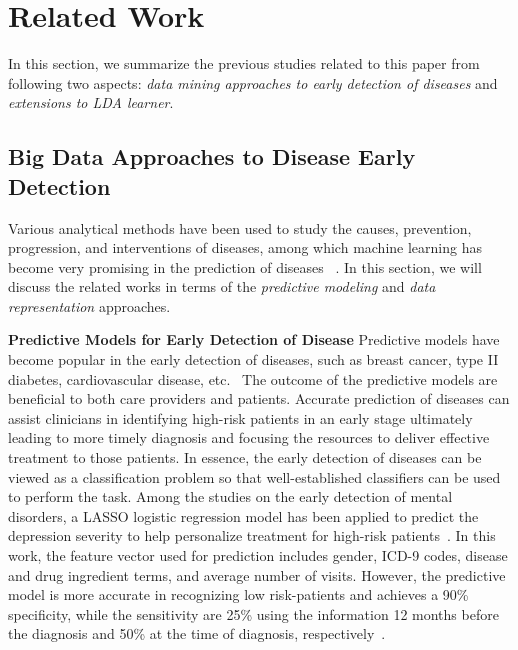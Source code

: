 \documentclass[journal,compsoc]{IEEEtran}
\begin{document}
\section{Related Work}\label{sec:2}

In this section, we summarize the previous studies related to this paper from following two aspects: \emph{data mining approaches to early detection of diseases} and \emph{extensions to LDA learner}.

\subsection{Big Data Approaches to Disease Early Detection}
Various analytical methods have been used to study the causes, prevention, progression, and interventions of diseases, among which machine learning has become very promising in the prediction of diseases ~\cite{maroco_data_2011, huang_toward_2014}. In this section, we will discuss the related works in terms of the \emph{predictive modeling} and \emph{data representation} approaches.

\textbf{Predictive Models for Early Detection of Disease} Predictive models have become popular in the early detection of diseases, such as breast cancer, type II diabetes, cardiovascular disease, etc.~\cite{Lindstrom01032003, riskprediction, zheng_predictive_2015, yoo_data_2011} The outcome of the predictive models are beneficial to both care providers and patients. Accurate prediction of diseases can assist clinicians in identifying high-risk patients in an early stage ultimately leading to more timely diagnosis and focusing the resources to deliver effective treatment to those patients. In essence, the early detection of diseases can be viewed as a classification problem so that well-established classifiers can be used to perform the task. Among the studies on the early detection of mental disorders, a LASSO logistic regression model has been applied to predict the depression severity to help personalize treatment for high-risk patients~\cite{huang_toward_2014}. In this work, the feature vector used for prediction includes gender, ICD-9 codes, disease and drug ingredient terms, and average number of visits. However, the predictive model is more accurate in recognizing low risk-patients and achieves a 90\% specificity, while the sensitivity are 25\% using the information 12 months before the diagnosis and 50\% at the time of diagnosis, respectively~\cite{huang_toward_2014}.
\end{document}
